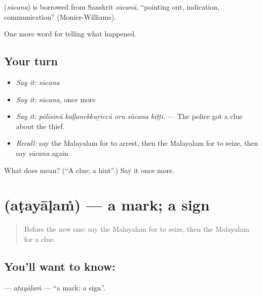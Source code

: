 \begin{cousinweb}
\textbf{} (\emph{sūcana}) is borrowed from Sanskrit \emph{sūcanā}, \textquotedblleft{}pointing out, indication, communication\textquotedblright{} (Monier-Williams).
\end{cousinweb}

\begin{grammarlens}[title={What you've built}]
One more word for telling what happened.
\end{grammarlens}

\subsection*{Your turn}
\begin{itemize}
\raggedright
  \item \emph{Say it:} \emph{sūcana}
  \item \emph{Say it:} \emph{sūcana}, once more
  \item \emph{Say it:} \emph{pōlīsinŭ kaḷḷanekkuṟiccŭ oru sūcana kiṭṭi.} — The police got a clue about the thief.
  \item \emph{Recall:} say the Malayalam for to arrest, then the Malayalam for to seize, then say \emph{sūcana} again
\end{itemize}

\begin{tcolorbox}[breakable,colback=teal!4,colframe=teal!35!black,title={Before you move on}]
What does  mean? (\textquotedblleft{}A clue; a hint\textquotedblright{}.) Say it once more.
\end{tcolorbox}
\section[\texorpdfstring{\ml{അടയാളം} (aṭayāḷaṁ)}{അടയാളം (aṭayāḷaṁ)}]{ (aṭayāḷaṁ) — a mark; a sign}

\label{lesson:ML-C366-atayalam}



\begin{quote}
Before the new one: say the Malayalam for to seize, then the Malayalam for a clue.
\end{quote}

\subsection*{You'll want to know: }
\textbf{} — \emph{aṭayāḷaṁ} — \textquotedblleft{}a mark; a sign\textquotedblright{}.

